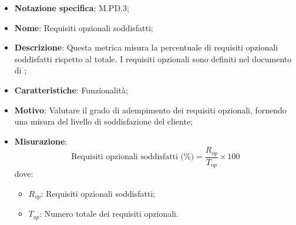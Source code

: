\begin{itemize}
    \item \textbf{Notazione specifica}: M.PD.3;
    \item \textbf{Nome}: Requisiti opzionali soddisfatti;
    \item \textbf{Descrizione}: Questa metrica misura la percentuale di requisiti opzionali soddisfatti rispetto al totale. I requisiti opzionali sono definiti nel documento di \AnalisiDeiRequisiti;
    \item \textbf{Caratteristiche}: Funzionalità;
    \item \textbf{Motivo}: Valutare il grado di adempimento dei requisiti opzionali, fornendo una misura del livello di soddisfazione del cliente;
    \item \textbf{Misurazione}:
    \[
    \text{Requisiti opzionali soddisfatti (\%)} = \frac{R_{op}}{T_{op}} \times 100
    \]
    dove:
    \begin{itemize}
        \item $R_{op}$: Requisiti opzionali soddisfatti;
        \item $T_{op}$: Numero totale dei requisiti opzionali.
    \end{itemize}
\end{itemize}